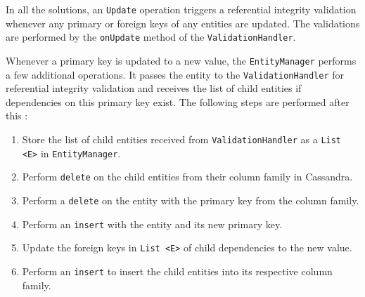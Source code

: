 		In all the solutions,  an \texttt{Update} operation triggers a referential
		integrity validation whenever any primary or foreign keys of any entities are updated.
		The validations are performed by the \texttt{onUpdate} method of the
		\texttt{ValidationHandler}.
		
		Whenever a primary key is updated to a new value, the
		\texttt{EntityManager} performs a few additional operations. It passes the entity to the
		\texttt{ValidationHandler} for referential integrity validation and receives
		the list of child entities if dependencies on this primary key exist. The
		following steps are performed after this :
		\begin{enumerate}
		  \item Store the list of child entities received from
		  \texttt{ValidationHandler} as a \texttt{List <E>} in
		  \texttt{EntityManager}.
		  \item Perform \texttt{delete} on the child entities from their column family
		  in Cassandra.
		  \item Perform a \texttt{delete} on the entity with the primary key from the
		  column family.
		  \item Perform an \texttt{insert} with the entity and its new primary key.
		  \item Update the foreign keys in \texttt{List <E>} of child dependencies to
		  the new value.
		  \item Perform an \texttt{insert} to insert the child entities into its
		  respective column family.
		\end{enumerate}
		
